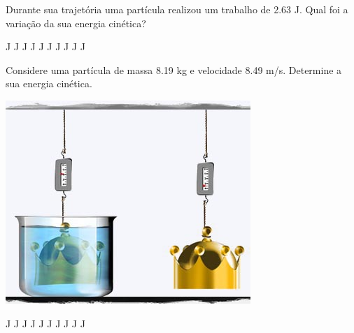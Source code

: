 \documentclass[12pt, addpoints]{exam}
\begin{document}
\begin{questions}
\begin{multicols}{2}
\question[33] Durante sua trajetória uma partícula realizou um trabalho de    2.63 J. Qual foi a variação da sua energia cinética?

\begin{oneparchoices}
 J J J J J J J J J J\end{oneparchoices}

\begin{oneparchoices}
\end{oneparchoices}
\question[23] Considere uma partícula de massa    8.19 kg e velocidade    8.49 m/s. Determine a sua energia cinética.

\begin{center}
\begin{minipage}[c]{0.75\linewidth}
\includegraphics[width=\textwidth]{MWE001.jpg}
\end{minipage}

\end{center}
\begin{oneparchoices}
 J J J J J J J J J J\end{oneparchoices}

\begin{oneparchoices}
\end{oneparchoices}
\end{multicols}
\end{questions}
\newpage
\end{document}
